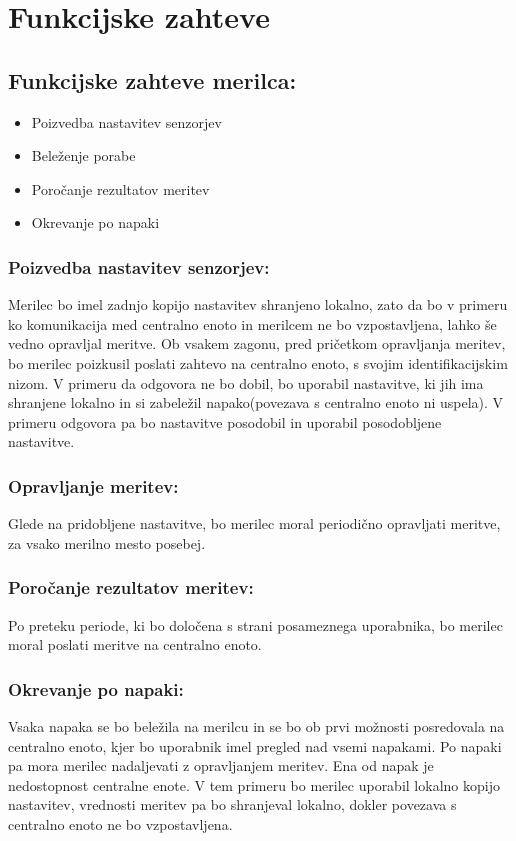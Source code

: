 \documentclass[12pt,a4paper,titlepage,openany]{report}
\begin{document}
\section{Funkcijske zahteve}
\thispagestyle{fancy}


\subsection{Funkcijske zahteve merilca:}


\begin{itemize}
\item Poizvedba nastavitev senzorjev
\item Beleženje porabe
\item Poročanje rezultatov meritev
\item Okrevanje po napaki
\end{itemize}

\subsubsection{Poizvedba nastavitev senzorjev:}
Merilec bo imel zadnjo kopijo nastavitev shranjeno lokalno, zato da bo v primeru ko komunikacija med centralno enoto in merilcem ne bo vzpostavljena, lahko še vedno opravljal meritve. 
Ob vsakem zagonu, pred pričetkom opravljanja meritev, bo merilec poizkusil poslati zahtevo na centralno enoto, s svojim identifikacijskim nizom. V primeru da odgovora ne bo dobil, bo uporabil nastavitve, ki jih ima shranjene lokalno in si zabeležil napako(povezava s centralno enoto ni uspela). V primeru odgovora pa bo nastavitve posodobil in uporabil posodobljene nastavitve. 

\subsubsection{Opravljanje meritev:}
Glede na pridobljene nastavitve, bo merilec moral periodično opravljati meritve, za vsako merilno mesto posebej. 
\subsubsection{Poročanje rezultatov meritev:}
Po preteku periode, ki bo določena s strani posameznega uporabnika, bo merilec moral poslati meritve na centralno enoto. 
\subsubsection{Okrevanje po napaki:}
Vsaka napaka se bo beležila na merilcu  in se bo ob prvi možnosti posredovala na centralno enoto, kjer bo uporabnik imel pregled nad vsemi napakami. Po napaki pa mora merilec nadaljevati z opravljanjem meritev. Ena od napak je nedostopnost centralne enote. V tem primeru bo merilec uporabil lokalno kopijo nastavitev, vrednosti meritev pa bo shranjeval lokalno, dokler povezava s centralno enoto ne bo vzpostavljena. 
\end{document}
